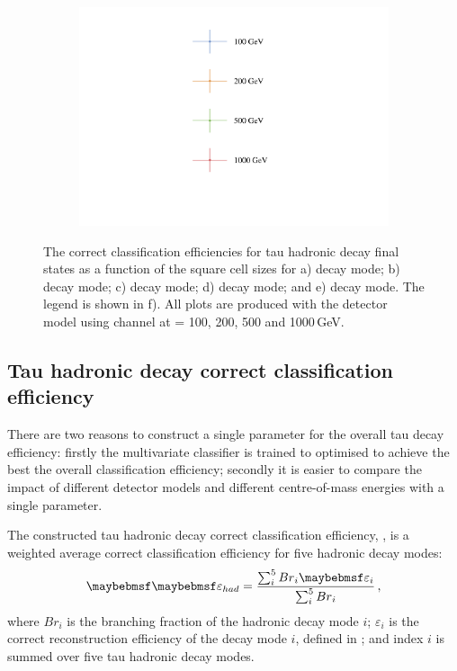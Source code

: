 \begin{figure}[htbp]
\begin{subfigure}[b]{0.45\textwidth}
  \caption{}
  \label{fig:tauDecayMode6}
\end{subfigure}
\begin{subfigure}[b]{0.45\textwidth}
  \includegraphics[width=\textwidth]{tau/plots3/legend.pdf}
  \caption{}
  \label{fig:tauDecayLegend}
\end{subfigure}
\caption[The correct classification efficiency for  tau hadronic decay final states  as a function of the \ECAL square cell sizes]
{ The correct classification efficiencies for  tau hadronic decay final states  as a function of the \ECAL square cell sizes for a) \decayPionShort decay mode; b) \decayRhoShortest decay mode; c) \decayAiPhotonShortest decay mode; d) \decayAiPionShortest decay mode; and e) \decayThreePionPhotonShort decay mode. The legend is shown in f). All plots are produced with  the \ILD detector model using \eeTauTau channel at \sqrtS = 100, 200, 500 and 1000\,GeV.}
\label{fig:TauPionEfficiency}
\end{figure}


\subsection{Tau hadronic decay correct classification efficiency}

There are two reasons to construct a single parameter for  the overall tau decay efficiency: firstly the multivariate classifier is trained to optimised to achieve the best the overall classification efficiency; secondly it is easier to compare the impact of different detector models and different centre-of-mass energies with a single parameter.

The constructed tau hadronic decay correct classification efficiency, \tauHad, is a weighted average correct classification efficiency for five hadronic decay modes:
\begin{equation}
\tauHad = \frac{\sum_{i}^5 {Br}_{i}\varepsilon_{i}}{\sum_{i}^5 {Br}_{i}}  \,,
\label{eq:had}
\end{equation}
where $Br_{i}$ is the branching fraction of the hadronic decay mode $i$; $\varepsilon_{i}$ is the correct reconstruction efficiency of the decay mode $i$, defined in ; and index $i$ is summed over five tau hadronic decay modes.

